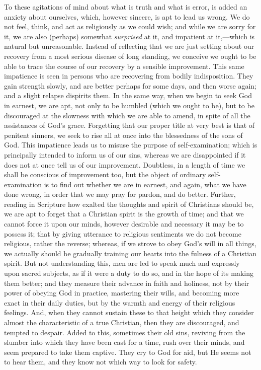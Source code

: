 To these agitations of mind about what is truth and
what is error, is added an anxiety about ourselves,
which, however sincere, is apt to lead us wrong. We do
not feel, think, and act as religiously as we could wish;
and while we are sorry for it, we are also (perhaps)
somewhat \emph{surprised} at it, and impatient at
it,—which is natural but unreasonable. Instead of
reflecting that we are just setting about our recovery
from a most serious disease of long standing, we conceive
we ought to be able to trace the course of our recovery
by a sensible improvement. This same impatience is seen
in persons who are recovering from bodily indisposition.
They gain strength slowly, and are better perhaps for
some days, and then worse again; and a slight relapse
dispirits them. In the same way, when we begin to seek
God in earnest, we are apt, not only to be humbled (which
we ought to be), but to be discouraged at the slowness
with which we are able to amend, in spite of all the
assistances of God's grace. Forgetting that our proper
title at very best is that of penitent sinners, we seek
to rise all at once into the blessedness of the sons of
God. This impatience leads us to misuse the purpose of
self-examination; which is principally intended to inform
us of our sins, whereas we are disappointed if it does
not at once tell us of our improvement. Doubtless, in a
length of time we shall be conscious of improvement too,
but the object of ordinary self-examination is to find
out whether we are in earnest, and again, what we have
done wrong, in order that we may pray for pardon, and do
better. Further, reading in Scripture how exalted the
thoughts and spirit of Christians should be, we are apt
to forget that a Christian spirit is the growth of time;
and that we cannot force it upon our minds, however
desirable and necessary it may be to possess it; that by
giving utterance to religious sentiments we do not become
religious, rather the reverse; whereas, if we strove to
obey God's will in all things, we actually should be
gradually training our hearts into the fulness of a
Christian spirit. But not understanding this, men are led
to speak much and expressly upon sacred subjects, as if
it were a duty to do so, and in the hope of its making
them better; and they measure their advance in faith and
holiness, not by their power of obeying God in practice,
mastering their wills, and becoming more exact in their
daily duties, but by the warmth and energy of their
religious feelings. And, when they cannot sustain these
to that height which they consider almost the
characteristic of a true Christian, then they are
discouraged, and tempted to despair. Added to this,
sometimes their old sins, reviving from the slumber into
which they have been cast for a time, rush over their
minds, and seem prepared to take them captive. They cry
to God for aid, but He seems not to hear them, and they
know not which way to look for safety.


